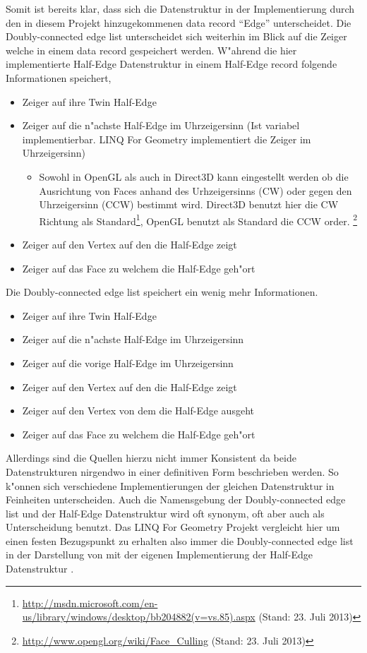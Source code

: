 \documentclass[pagesize, paper=a4, fontsize=12pt,titlepage=true, headings=small, headnosepline, abstractoff, liststotoc, nochapterprefix, plainheadsepline]{scrreprt}
\newcommand{\LFGS}{LINQ For Geometry }
\newcommand{\HES}{Half-Edge Datenstruktur }
\begin{document}
Somit ist bereits klar, dass sich die Datenstruktur in der Implementierung durch den in diesem Projekt hinzugekommenen data record "`Edge"' unterscheidet. Die Doubly-connected edge list unterscheidet sich weiterhin im Blick auf die Zeiger welche in einem data record gespeichert werden. W"ahrend die hier implementierte \HES in einem Half-Edge record folgende Informationen speichert,
\begin{itemize}
\item Zeiger auf ihre Twin Half-Edge
\item Zeiger auf die n"achste Half-Edge im Uhrzeigersinn (Ist variabel implementierbar. \LFGS implementiert die Zeiger im Uhrzeigersinn)
\begin{itemize}
\item Sowohl in OpenGL als auch in Direct3D kann eingestellt werden ob die Ausrichtung von Faces anhand des Urhzeigersinns (CW) oder gegen den Uhrzeigersinn (CCW) bestimmt wird. Direct3D benutzt hier die CW Richtung als Standard\footnote[1]{\url{http://msdn.microsoft.com/en-us/library/windows/desktop/bb204882(v=vs.85).aspx} (Stand: 23. Juli 2013)}, OpenGL benutzt als Standard die CCW order. \footnote[2]{\url{http://www.opengl.org/wiki/Face_Culling} (Stand: 23. Juli 2013)}
\end{itemize}
\item Zeiger auf den Vertex auf den die Half-Edge zeigt
\item Zeiger auf das Face zu welchem die Half-Edge geh"ort
\end{itemize}

Die Doubly-connected edge list speichert ein wenig mehr Informationen.
\begin{itemize}
\item Zeiger auf ihre Twin Half-Edge
\item Zeiger auf die n"achste Half-Edge im Uhrzeigersinn
\item Zeiger auf die vorige Half-Edge im Uhrzeigersinn
\item Zeiger auf den Vertex auf den die Half-Edge zeigt
\item Zeiger auf den Vertex von dem die Half-Edge ausgeht
\item Zeiger auf das Face zu welchem die Half-Edge geh"ort
\end{itemize}

Allerdings sind die Quellen hierzu nicht immer Konsistent da beide Datenstrukturen nirgendwo in einer definitiven Form beschrieben werden. So k"onnen sich verschiedene Implementierungen der gleichen Datenstruktur in Feinheiten unterscheiden. Auch die Namensgebung der Doubly-connected edge list und der \HES wird oft synonym, oft aber auch als Unterscheidung benutzt. Das \LFGS Projekt vergleicht hier um einen festen Bezugspunkt zu erhalten also immer die Doubly-connected edge list in der Darstellung von \cite[S.~30 und Folgende]{vanMarkdeBerg.2008} mit der eigenen Implementierung der \HES.
\end{document}
